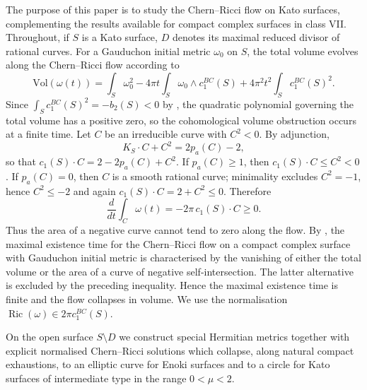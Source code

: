 \documentclass[12pt]{amsart}
\numberwithin{equation}{section}
\theoremstyle{remark}
\theoremstyle{definition}
\begin{document}
\bigskip

The purpose of this paper is to study the Chern--Ricci flow on Kato surfaces, complementing the results available for compact complex surfaces in class VII.
Throughout, if $S$ is a Kato surface, $D$ denotes its maximal reduced divisor of rational curves.
For a Gauduchon initial metric $\omega_0$ on $S$, the total volume evolves along the Chern--Ricci flow according to \cite{tosatti-weinkove}
$$\mathrm{Vol}(\omega(t))=\int_S\omega_0^2-4\pi t\int_S\omega_0\wedge c_1^{BC}(S)+4\pi^2t^2\int_S c_1^{BC}(S)^2.$$
Since $\int_S c_1^{BC}(S)^2=-b_2(S)<0$ by \cite[page 49]{dloussky-Kato}, the quadratic polynomial governing the total volume has a positive zero, so the cohomological volume obstruction occurs at a finite time. Let $C$ be an irreducible curve with $C^2<0$. By adjunction,
$$
K_S\cdot C+C^2=2p_a(C)-2,
$$
so that $c_1(S)\cdot C=2-2p_a(C)+C^2$. If $p_a(C)\geq1$, then $c_1(S)\cdot C\leq C^2<0$. If $p_a(C)=0$, then $C$ is a smooth rational curve; minimality excludes $C^2=-1$, hence $C^2\leq-2$ and again $c_1(S)\cdot C=2+C^2\leq0$. Therefore
$$
\frac{d}{dt}\int_C\omega(t)=-2\pi\,c_1(S)\cdot C\geq0.
$$
Thus the area of a negative curve cannot tend to zero along the flow. By \cite[Corollary 1.4]{tosatti-weinkove}, the maximal existence time for the Chern--Ricci flow on a compact complex surface with Gauduchon initial metric is characterised by the vanishing of either the total volume or the area of a curve of negative self-intersection. The latter alternative is excluded by the preceding inequality. Hence the maximal existence time is finite and the flow collapses in volume. We use the normalisation $\operatorname{Ric}(\omega)\in 2\pi c_1^{BC}(S)$.

On the open surface $S\setminus D$ we construct special Hermitian metrics together with explicit normalised Chern--Ricci solutions which collapse, along natural compact exhaustions, to an elliptic curve for Enoki surfaces and to a circle for Kato surfaces of intermediate type in the range $0<\mu<2$.
\end{document}
